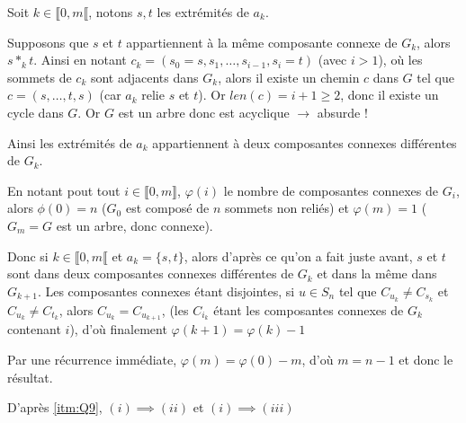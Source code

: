 \documentclass{article}
\begin{document}
\begin{question}
    \item \label{itm:Q9} Soit $k \in \llbracket 0, m \llbracket$, notons $s, t$ les extrémités
    de $a_k$.

    Supposons que $s$ et $t$ appartiennent à la même composante connexe de
    $G_k$, alors $s \ast_k t$. Ainsi en notant 
    $c_k = (s_0 = s, s_1, \hdots, s_{i - 1}, s_i = t)$ (avec $i > 1$), où les
    sommets de $c_k$ sont adjacents dans $G_k$, alors il existe un chemin $c$ 
    dans $G$ tel que $c = (s, \hdots, t, s)$ (car $a_k$ relie $s$ et $t$). Or
    $len(c) = i + 1 \geqslant 2$, donc il existe un cycle dans $G$. Or $G$ est 
    un arbre donc est acyclique $\rightarrow$ absurde !

    Ainsi les extrémités de $a_k$ appartiennent à deux composantes connexes
    différentes de $G_k$.

    En notant pout tout $i \in \llbracket 0, m \rrbracket$,
    $\varphi(i)$ le nombre de composantes connexes de $G_i$, alors
    $\phi(0) = n$ ($G_0$ est composé de $n$ sommets non reliés) et $\varphi(m) = 1$ ($G_m = G$ est
    un arbre, donc connexe).

    Donc si $k \in \llbracket 0, m \llbracket$ et $a_k = \{s, t\}$, alors
    d'après ce qu'on a fait juste avant, $s$ et $t$ sont dans deux composantes
    connexes différentes de $G_k$ et dans la même dans $G_{k + 1}$. Les
    composantes connexes étant disjointes, si $u \in S_n$ tel que $C_{u_k} \neq
    C_{s_k}$ et $C_{u_k} \neq C_{t_k}$, alors $C_{u_k} = C_{u_{k + 1}}$, 
    (les $C_{i_k}$ étant les composantes connexes de $G_k$ contenant $i$), d'où
    finalement $\varphi(k + 1) = \varphi(k) - 1$

    Par une récurrence immédiate, $\varphi(m) = \varphi(0) - m$, d'où 
    $m = n - 1$ et donc le résultat.

    \item D'après \ref{itm:Q9}, $(i) \implies (ii)$ et $(i) \implies (iii)$
    
\end{question}
\end{document}
